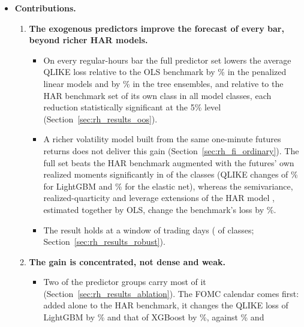 \begin{itemize}
\begin{itemize}
    \citep{DieboldMariano1995}. QLIKE weighs an error relative to the forecast and, like squared error, ranks
    forecasts consistently despite noise in the realized-variance proxy \citep{Patton2011}.
  \end{itemize}
\item \textbf{Contributions.}
  \begin{enumerate}
  \item \textbf{The exogenous predictors improve the forecast of every bar, beyond richer HAR models.}
    \begin{itemize}
    \item On every regular-hours bar the full predictor set lowers the average QLIKE loss relative to the OLS
      benchmark by \rhorVsOlsRedLinRng{}\% in the penalized linear models and by
      \rhorVsOlsRedTreeRng{}\% in the tree ensembles, and relative to the HAR benchmark set of its own class
      in all \rhorAfPairs{} model classes, each reduction statistically significant at the 5\% level
      (Section~\ref{sec:rh_results_oos}).
    \item A richer volatility model built from the same one-minute futures returns does not deliver this gain
      (Section~\ref{sec:rh_fi_ordinary}). The full set beats the HAR benchmark augmented with the futures' own
      realized moments significantly in \rhabNClassesBeatAddRm{} of the \rhabNClassesAddRm{} classes (QLIKE changes
      of \rhabLgbmFullVsAddRmAllPct\% for LightGBM and \rhabEnetFullVsAddRmAllPct\% for the elastic net), whereas the
      semivariance, realized-quarticity and leverage extensions of the HAR model
      \citep{PattonSheppard2015,BollerslevPattonQuaedvlieg2016,CorsiReno2012}, estimated together by OLS, change the
      benchmark's loss by \rhabOlsSharqlAllPct\%.
    \item The result holds at a window of \rhrbWinLong{} trading days (\rhrbNFullLowerSigBarLong{} of
      \rhrbNModelsLong{} classes; Section~\ref{sec:rh_results_robust}).
    \end{itemize}
  \item \textbf{The gain is concentrated, not dense and weak.}
    \begin{itemize}
    \item Two of the \bkNBuckets{} predictor groups carry most of it (Section~\ref{sec:rh_results_ablation}). The
      FOMC calendar comes first: added alone to the HAR benchmark, it changes the QLIKE loss of LightGBM by
      \rhabLgbmAddFomcAllPct\% and that of XGBoost by \rhabXgbAddFomcAllPct\%, against \rhabLgbmFullAllPct\% and

\end{itemize}
\end{enumerate}
\end{itemize}
